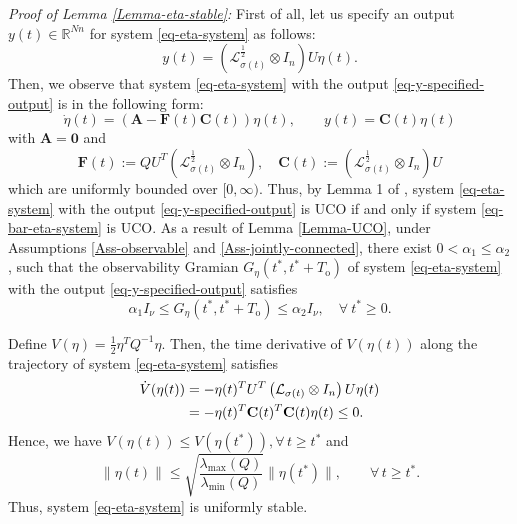 \documentclass[twocolumn]{autart}
\newcommand{\RR}{\mathbb{R}}
\begin{document}
\medskip \noindent
\emph{Proof of Lemma \ref{Lemma-eta-stable}:}
First of all,
let us specify an output $y(t)\in \RR^{Nn}$ for system \eqref{eq-eta-system} as follows:
\begin{equation}\label{eq-y-specified-output}
    y(t)=\left(\mathcal{L}_{\sigma(t)}^{\frac{1}{2}} \otimes I_{n}\right)U\eta(t).
\end{equation}
Then, we observe that system \eqref{eq-eta-system} with the output \eqref{eq-y-specified-output} is in the following form:
\begin{equation*}
\dot{\eta}(t) = \left(\mathbf{A}-\mathbf{F}(t)\mathbf{C}(t)\right)\eta(t),
\qquad y(t)=\mathbf{C}(t)\eta(t)
\end{equation*}
with $\mathbf{A}=\mathbf{0}$ and
\begin{equation*}
   \mathbf{F}(t):=Q U^{T}\left(\mathcal{L}^{\frac{1}{2}}_{\sigma(t)} \otimes I_{n}\right), \quad \mathbf{C}(t):=\left(\mathcal{L}_{\sigma(t)}^{\frac{1}{2}} \otimes I_{n}\right)U
\end{equation*}
which are uniformly bounded over $[0,\infty)$.
Thus, by Lemma 1 of \cite{Anderson77},
system \eqref{eq-eta-system} with the output \eqref{eq-y-specified-output} is UCO if and only if system \eqref{eq-bar-eta-system} is UCO.
As a result of Lemma \ref{Lemma-UCO}, under Assumptions \ref{Ass-observable} and \ref{Ass-jointly-connected},
there exist  $0<\alpha_{1}\le \alpha_{2}$,
such that the observability Gramian
  $G_{\eta}(t^{*},t^{*}+T_{\text{o}})$ of system \eqref{eq-eta-system} with the output \eqref{eq-y-specified-output} satisfies
\begin{equation}\label{eq-Gramian-inequality}
    \alpha_{1}I_{\nu} \le G_{\eta}(t^{*},t^{*}+T_{\text{o}}) \le \alpha_{2}I_{\nu},\quad  \forall\ t^{*}\ge 0.
\end{equation}


Define $V(\eta)=\frac{1}{2}\eta^{T}Q^{-1}\eta$.
Then, the time derivative of $V(\eta(t))$ along the trajectory of system \eqref{eq-eta-system} satisfies
\begin{align}\label{eq-V-dot}
    \dot{V}(\eta(t))&= - \eta(t)^{T} U^{T}
    \left(\mathcal{L}_{\sigma(t)} \otimes I_{n}\right)U\eta(t)  \notag\\
    &=- \eta(t)^{T}\mathbf{C}(t)^{T}\mathbf{C}(t)\eta(t) \le 0.
\end{align}
Hence, we have $V(\eta(t))\le V(\eta(t^{*})),\forall\, t\ge t^{*}$ and
\begin{equation*}
    \|\eta(t)\| \le  \sqrt{\frac{\lambda_{\max}(Q)}{\lambda_{\min}(Q)}} \|\eta(t^{*})\|, \qquad \forall\, t\ge t^{*}.
\end{equation*}
Thus, system \eqref{eq-eta-system} is uniformly stable.
\end{document}
